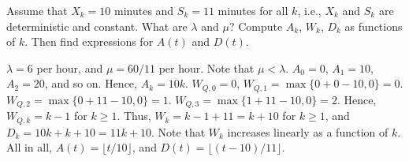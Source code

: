 \begin{extra}
 Assume that $X_k = 10$ minutes and $S_k = 11$ minutes for all
 $k$, i.e., $X_k$ and $S_k$ are deterministic and constant. What
 are $\lambda$ and $\mu$? Compute $A_k$, $W_k$, $D_k$ as functions of $k$. Then find expressions for $A(t)$ and $D(t)$.
\begin{solution}
 $\lambda=6$ per hour, and $\mu=60/11$ per hour. Note that
 $\mu < \lambda$. $A_0 = 0$, $A_1=10$, $A_2=20$, and so on. Hence,
 $A_k = 10k$. $W_{Q,0} = 0$, $W_{Q,1} = \max\{0 + 0-10,0\} = 0$.
 $W_{Q,2} = \max\{0+11-10,0\} =1$.
 $W_{Q,3} = \max\{1+11-10,0\} =2$. Hence, $W_{Q,k} = k-1$ for
 $k\geq1$. Thus, $W_k = k-1+11 = k + 10$ for $k\geq1$, and
 $D_k = 10k + k+10 = 11k+10$. Note that $W_k$ increases linearly
 as a function of $k$. All in all, $A(t) = \lfloor t/10\rfloor$, and $D(t) = \lfloor (t-10)/11 \rfloor$.
\end{solution}
\end{extra}



